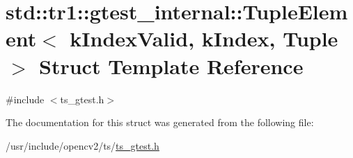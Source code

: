 \hypertarget{structstd_1_1tr1_1_1gtest__internal_1_1TupleElement}{\section{std\-:\-:tr1\-:\-:gtest\-\_\-internal\-:\-:Tuple\-Element$<$ k\-Index\-Valid, k\-Index, Tuple $>$ Struct Template Reference}
\label{structstd_1_1tr1_1_1gtest__internal_1_1TupleElement}
}


{\ttfamily \#include $<$ts\-\_\-gtest.\-h$>$}



The documentation for this struct was generated from the following file\-:\begin{DoxyCompactItemize}
\item 
/usr/include/opencv2/ts/\hyperlink{ts__gtest_8h}{ts\-\_\-gtest.\-h}\end{DoxyCompactItemize}

